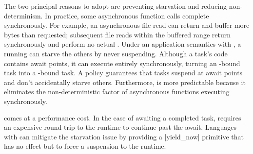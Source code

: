 The two principal reasons to adopt \static \suspension are preventing starvation and reducing non-determinism. In practice, some asynchronous function calls complete synchronously. For example, an asynchronous file read can return and buffer more bytes than requested; subsequent file reads within the buffered range return synchronously and perform no actual . Under an \eager application semantics with \dynamic \suspension, a running \task can starve the others by never suspending. Although a task's code contains await points, it can execute entirely synchronously, turning an -bound task into a -bound task. A \static \suspension policy guarantees that tasks suspend at await points and don't accidentally starve others. Furthermore, \static \suspension is more predictable because it eliminates the non-deterministic factor of asynchronous functions executing synchronously.

\Static \suspension comes at a performance cost. In the case of awaiting a completed task, \static \suspension requires an expensive round-trip to the runtime to continue past the await. Languages with \dynamic \suspension can mitigate the starvation issue by providing a \code|yield_now| primitive that has no effect but to force a suspension to the runtime.

